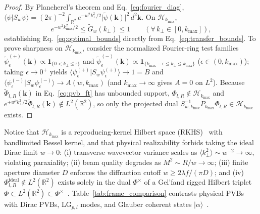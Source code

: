 \documentclass[aps,pra,reprint,amsmath,amssymb,floatfix,longbibliography]{revtex4-2}
\providecommand{\ket}[1]{\lvert#1\rangle}
\providecommand{\braket}[2]{\langle#1\vert#2\rangle}
\providecommand{\abs}[1]{\lvert#1\rvert}
\begin{document}
\begin{proof}
By Plancherel's theorem and Eq.~\eqref{eq:fourier_diag}, $\braket{\psi}{S_w\psi} = (2\pi)^{-2}\int_{\mathbb{R}^2} e^{-w^2 k_\perp^2/2}\abs{\widetilde{\psi}(\mathbf{k})}^2\,d^2\mathbf{k}$. On $\mathcal{H}_{k_{\max}}$,
\begin{equation}
e^{-w^2 k_{\max}^2/2} \le \widetilde{G}_w(k_\perp) \le 1 \qquad (\forall\, k_\perp \in [0, k_{\max}]),
\label{eq:transfer_bounds}
\end{equation}
establishing Eq.~\eqref{eq:optimal_bounds} directly from Eq.~\eqref{eq:transfer_bounds}. To prove sharpness on $\mathcal{H}_{k_{\max}}$, consider the normalized Fourier-ring test families $\widetilde{\psi}_\epsilon^{(+)}(\mathbf{k}) \propto \mathbf{1}_{\{0 < k_\perp \le \epsilon\}}$ and $\widetilde{\psi}_\epsilon^{(-)}(\mathbf{k}) \propto \mathbf{1}_{\{k_{\max}-\epsilon \le k_\perp \le k_{\max}\}}$ ($\epsilon \in (0, k_{\max})$); taking $\epsilon \to 0^+$ yields $\braket{\psi_\epsilon^{(+)}}{S_w\psi_\epsilon^{(+)}} \to 1 = B$ and $\braket{\psi_\epsilon^{(-)}}{S_w\psi_\epsilon^{(-)}} \to A(w,k_{\max})$ (and $k_{\max} \to \infty$ gives $A=0$ on $L^2$). Because $\widetilde{\Phi}_{l,R}(\mathbf{k})$ in Eq.~\eqref{eq:pvb_ft} has unbounded support, $\Phi_{l,R} \notin \mathcal{H}_{k_{\max}}$ and $e^{+w^2 k_\perp^2/2}\widetilde{\Phi}_{l,R}(\mathbf{k}) \notin L^2(\mathbb{R}^2)$, so only the projected dual $S_{w,k_{\max}}^{-1}P_{k_{\max}}\Phi_{l,R} \in \mathcal{H}_{k_{\max}}$ exists.
\end{proof}

Notice that $\mathcal{H}_{k_{\max}}$ is a reproducing-kernel Hilbert space (RKHS)~\cite{PaulsenRaghupathi2016} with bandlimited Bessel kernel, and that physical realizability forbids taking the ideal Dirac limit $w \to 0$: (i) transverse wavevector variance scales as $\langle k_\perp^2 \rangle \sim w^{-2} \to \infty$, violating paraxiality; (ii) beam quality degrades as $M^2 \sim R/w \to \infty$; (iii) finite aperture diameter $D$ enforces the diffraction cutoff $w \ge 2\lambda f/(\pi D)$; and (iv) $\Phi_{l,R}^{\mathrm{ideal}} \notin L^2(\mathbb{R}^2)$ exists solely in the dual $\Phi^\times$ of a Gel'fand rigged Hilbert triplet $\Phi \subset L^2(\mathbb{R}^2) \subset \Phi^\times$~\cite{Gelfand1964}. Table~\ref{tab:frame_comparison} contrasts physical PVBs with Dirac PVBs, $\mathrm{LG}_{p,l}$ modes, and Glauber coherent states $\ket{\alpha}$~\cite{Klauder1985,Perelomov1986,Gazeau2009}.
\end{document}
